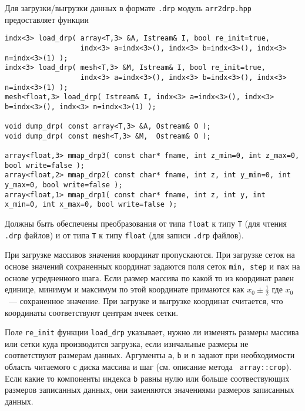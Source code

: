 Для загрузки/выгрузки данных в формате {\tt .drp} модуль {\tt arr2drp.hpp}
предоставляет функции
\begin{verbatim}
indx<3> load_drp( array<T,3> &A, Istream& I, bool re_init=true,
                  indx<3> a=indx<3>(), indx<3> b=indx<3>(), indx<3> n=indx<3>(1) );
indx<3> load_drp( mesh<T,3> &M, Istream& I, bool re_init=true,
                  indx<3> a=indx<3>(), indx<3> b=indx<3>(), indx<3> n=indx<3>(1) );
mesh<float,3> load_drp( Istream& I, indx<3> a=indx<3>(), indx<3> b=indx<3>(), indx<3> n=indx<3>(1) );

void dump_drp( const array<T,3> &A, Ostream& O );
void dump_drp( const mesh<T,3> &M,  Ostream& O );

array<float,3> mmap_drp3( const char* fname, int z_min=0, int z_max=0, bool write=false );
array<float,2> mmap_drp2( const char* fname, int z, int y_min=0, int y_max=0, bool write=false );
array<float,1> mmap_drp1( const char* fname, int z, int y, int x_min=0, int x_max=0, bool write=false );
\end{verbatim}
Должны быть обеспечены преобразования от типа {\tt float} к типу {\tt T} (для
чтения {\tt .drp} файлов) и от типа {\tt T} к типу
{\tt float} (для записи {\tt .drp} файлов).

При загрузке массивов значения координат пропускаются. При загрузке сеток на
основе значений сохраненных координат задаются поля сеток {\tt min, step} и
{\tt max} на основе усредненного шага. Если размер массива по какой то из
координат равен единице, минимум и максимум по этой координате примаются как
$x_0\pm\frac 12$ где $x_0$~--- сохраненное значение. При загрузке и выгрузке
координат считается, что координаты соответствуют центрам ячеек сетки.

Поле {\tt re\_init} функции {\tt load\_drp} указывает, нужно ли изменять размеры массива или сетки
куда производится загрузка, если изнчальные размеры не соответствуют размерам
данных. Аргументы {\tt a}, {\tt b} и {\tt n} 
задают при необходимости
область читаемого с диска массива  и
шаг  (см. описание метода {\tt
  array::crop}). Если какие то компоненты индекса {\tt b} равны нулю или
больше соотвествующих размеров записанных данных, они
заменяются значениями размеров записанных данных.

